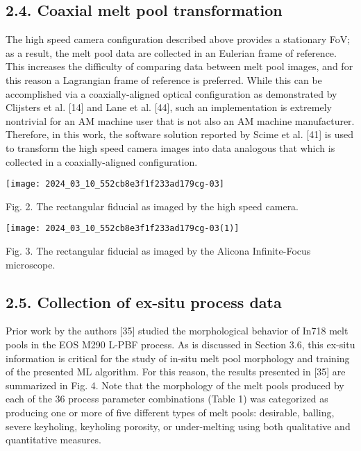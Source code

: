 \documentclass[10pt]{article}
\begin{document}
\subsection*{2.4. Coaxial melt pool transformation}
The high speed camera configuration described above provides a stationary FoV; as a result, the melt pool data are collected in an Eulerian frame of reference. This increases the difficulty of comparing data between melt pool images, and for this reason a Lagrangian frame of reference is preferred. While this can be accomplished via a coaxially-aligned optical configuration as demonstrated by Clijsters et al. [14] and Lane et al. [44], such an implementation is extremely nontrivial for an AM machine user that is not also an AM machine manufacturer. Therefore, in this work, the software solution reported by Scime et al. [41] is used to transform the high speed camera images into data analogous that which is collected in a coaxially-aligned configuration.

\begin{center}
\texttt{[image: 2024\_03\_10\_552cb8e3f1f233ad179cg-03]}
\end{center}

Fig. 2. The rectangular fiducial as imaged by the high speed camera.

\begin{center}
\texttt{[image: 2024\_03\_10\_552cb8e3f1f233ad179cg-03(1)]}
\end{center}

Fig. 3. The rectangular fiducial as imaged by the Alicona Infinite-Focus microscope.

\subsection*{2.5. Collection of ex-situ process data}
Prior work by the authors [35] studied the morphological behavior of In718 melt pools in the EOS M290 L-PBF process. As is discussed in Section 3.6, this ex-situ information is critical for the study of in-situ melt pool morphology and training of the presented ML algorithm. For this reason, the results presented in [35] are summarized in Fig. 4. Note that the morphology of the melt pools produced by each of the 36 process parameter combinations (Table 1) was categorized as producing one or more of five different types of melt pools: desirable, balling, severe keyholing, keyholing porosity, or under-melting using both qualitative and quantitative measures.
\end{document}
